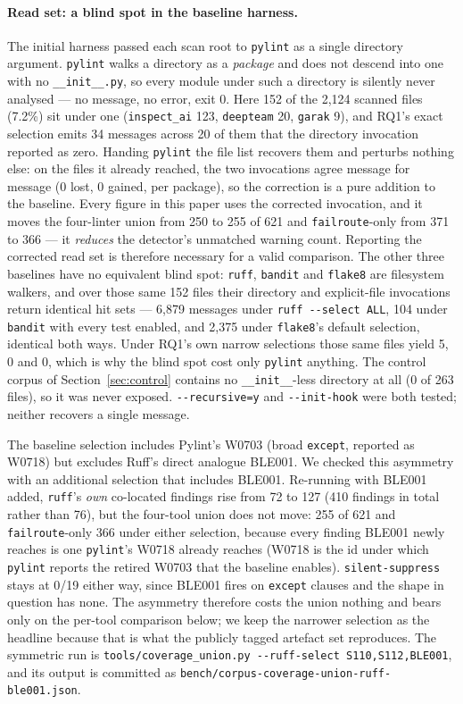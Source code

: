 \documentclass[10pt,a4paper]{article}
\begin{document}
\paragraph{Read set: a blind spot in the baseline harness.}
The initial harness passed each scan root to \texttt{pylint} as a single directory
argument. \texttt{pylint} walks a directory as a \emph{package}
and does not descend into one with no \texttt{\_\_init\_\_.py}, so every module
under such a directory is silently never analysed --- no message, no error, exit 0.
Here 152 of the 2{,}124 scanned files (7.2\%) sit under one (\texttt{inspect\_ai}
123, \texttt{deepteam} 20, \texttt{garak} 9), and RQ1's exact selection emits 34
messages across 20 of them that the directory invocation reported as zero. Handing
\texttt{pylint} the file list recovers them and perturbs nothing else: on the files
it already reached, the two invocations agree message for message (0 lost, 0
gained, per package), so the correction is a pure addition to the baseline. Every
figure in this paper uses the corrected invocation, and it moves the four-linter
union from 250 to 255 of 621 and \texttt{failroute}-only from 371 to 366 --- it
\emph{reduces} the detector's unmatched warning count. Reporting the corrected
read set is therefore necessary for a valid comparison. The other three baselines have no
equivalent blind spot: \texttt{ruff}, \texttt{bandit} and \texttt{flake8} are
filesystem walkers, and over those same 152 files their directory and
explicit-file invocations return identical hit sets --- 6{,}879 messages under
\texttt{ruff\ -{}-select\ ALL}, 104 under \texttt{bandit} with every test enabled,
and 2{,}375 under \texttt{flake8}'s default selection, identical both ways. Under
RQ1's own narrow selections those same files yield 5, 0 and 0, which is why the
blind spot cost only \texttt{pylint} anything. The control corpus of
Section~\ref{sec:control} contains no \texttt{\_\_init\_\_}-less directory at all
(0 of 263 files), so it was never exposed. \texttt{-{}-recursive=y} and
\texttt{-{}-init-hook} were both tested; neither recovers a single message.

The baseline selection includes Pylint's W0703 (broad \texttt{except},
reported as W0718) but excludes Ruff's direct analogue BLE001. We checked
this asymmetry with an additional selection that includes BLE001. Re-running with BLE001 added, \texttt{ruff}'s \emph{own}
co-located findings rise from 72 to 127 (410 findings in total rather than 76),
but the four-tool union does not move: 255 of 621 and \texttt{failroute}-only 366
under either selection, because every finding BLE001 newly reaches is one
\texttt{pylint}'s W0718 already reaches (W0718 is the id under which
\texttt{pylint} reports the retired W0703 that the baseline enables). \texttt{silent-suppress} stays at 0/19
either way, since BLE001 fires on \texttt{except} clauses and the shape in
question has none. The asymmetry therefore costs the union nothing and bears only
on the per-tool comparison below; we keep the narrower selection as the headline
because that is what the publicly tagged artefact set reproduces. The symmetric run
is \texttt{tools/coverage\_union.py -{}-ruff-select S110,S112,BLE001}, and its output
is committed as \texttt{bench/corpus-coverage-union-ruff-ble001.json}.
\end{document}
